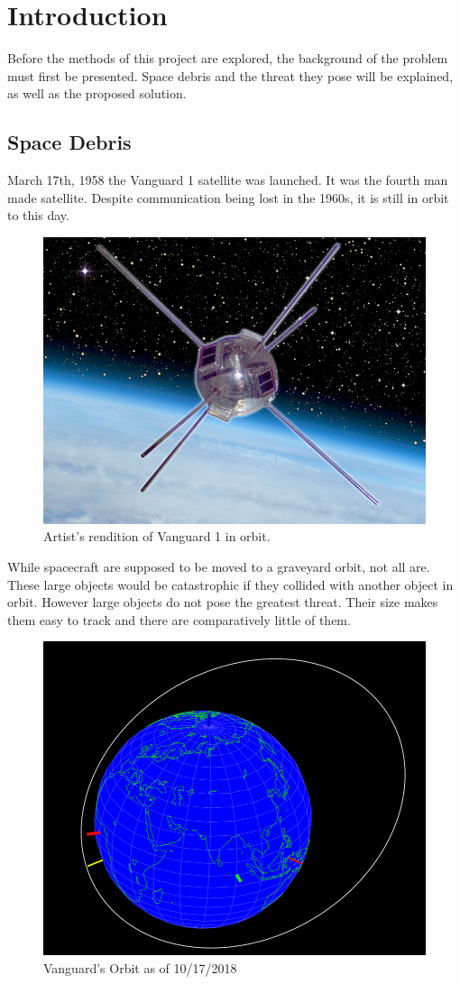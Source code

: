 \documentclass[12pt]{article}
\begin{document}
	\section{Introduction}
	Before the methods of this project are explored, the background of the problem must first be presented. Space debris and the threat they pose will be explained, as well as the proposed solution. 
	

	\subsection{Space Debris}
	
	March 17th, 1958 the Vanguard 1 satellite was launched. It was the fourth man made satellite. Despite communication being lost in the 1960s, it is still in orbit to this day. \par 
	
	\begin{figure}[h!]
		\centering
		\includegraphics[width=0.7\linewidth]{Vanguard_1_composite}
		\caption{Artist's rendition of Vanguard 1 in orbit\cite{usnrl_2008}.}
		\label{fig:vanguard1composite}
	\end{figure}
	
	While spacecraft are supposed to be moved to a graveyard orbit, not all are. These large objects would be catastrophic if they collided with another object in orbit. However large objects do not pose the greatest threat. Their size makes them easy to track and there are comparatively little of them. 
	
	\begin{figure}
		\centering
		\includegraphics[width=0.7\linewidth]{Vanguard_1_orbit}
		\caption{Vanguard's Orbit as of 10/17/2018}
		\label{fig:vanguard1orbit}
	\end{figure}
\end{document}
